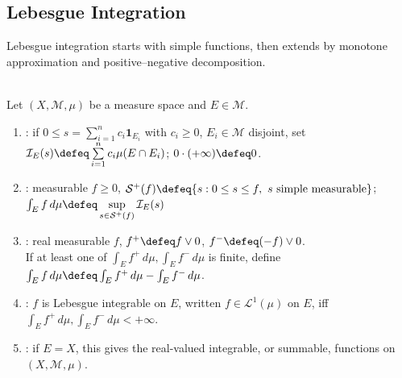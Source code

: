\subsection{Lebesgue Integration}

%

Lebesgue integration starts with simple functions, then extends by monotone approximation and positive--negative decomposition.

\begin{definition} \label{def:lebesgue-product-core-source-todo}\label{def:simple-functions-and-lebesgue-integral} \\
Let $(X,\mathcal{M},\mu)$ be a measure space and $E\in\mathcal{M}$.
\begin{enumerate}[label=(\roman*)]
\setlength{\itemsep}{0pt}
\item {}: if $0\leq s=\sum_{i=1}^{n}c_i\mathbf{1}_{E_i}$ with $c_i\geq0$, $E_i\in\mathcal{M}$ disjoint, set $\mathcal{I}_E(s)\defeq\sum\limits_{i=1}^{n}c_i\mu(E\cap E_i)$; $0\cdot(+\infty)\defeq0$.
\item {}: measurable $f\geq0$, $\mathcal{S}^+(f)\defeq\{s:0\leq s\leq f,\ s\text{ simple measurable}\}$; $\int_E f\,d\mu\defeq\sup\limits_{s\in\mathcal{S}^+(f)}\mathcal{I}_E(s)$
\item {}: real measurable $f$, $f^+\defeq f\vee0$, $f^-\defeq(-f)\vee0$.\\
If at least one of $\int_Ef^+\,d\mu,\int_Ef^-\,d\mu$ is finite, define $\int_E f\,d\mu\defeq\int_Ef^+\,d\mu-\int_Ef^-\,d\mu$.
\item {}: $f$ is Lebesgue integrable on $E$, written $f\in\mathscr{L}^1(\mu)$ on $E$, iff $\int_Ef^+\,d\mu,\int_Ef^-\,d\mu<+\infty$.
\item {}: if $E=X$, this gives the real-valued integrable, or summable, functions on $(X,\mathcal{M},\mu)$.
\end{enumerate}
\end{definition}


